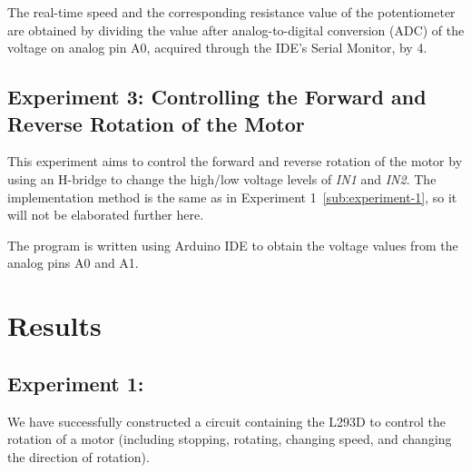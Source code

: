 \documentclass[a4paper,12pt]{article}
\begin{document}
The real-time speed and the corresponding resistance value of the potentiometer are obtained by dividing the value after analog-to-digital conversion (ADC) of the voltage on analog pin A0, 
acquired through the IDE's Serial Monitor, by 4.

\subsection*{Experiment 3: Controlling the Forward and Reverse Rotation of the Motor}
This experiment aims to control the forward and reverse rotation of the motor by using an H-bridge to change the high/low voltage levels of \textit{IN1} and \textit{IN2}. 
The implementation method is the same as in Experiment 1~\ref{sub:experiment-1}, so it will not be elaborated further here.

The program is written using Arduino IDE to obtain the voltage values from the analog pins A0 and A1.

\section*{Results}
\subsection*{Experiment 1:}
We have successfully constructed a circuit containing the L293D to control the rotation of a motor (including stopping, rotating, changing speed, and changing the direction of rotation).
\end{document}
